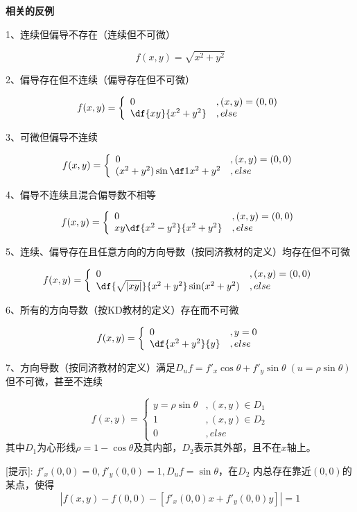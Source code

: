 \begin{shaded}
{\bf 相关的反例}

1、连续但偏导不存在（连续但不可微）

$$f(x,y)=\sqrt{x^2+y^2}$$

2、偏导存在但不连续（偏导存在但不可微）

$$
f(x,y)=\left\{\begin{array}{ll}
0 & ,(x,y)=(0,0)\\
\df{xy}{x^2+y^2}& ,else
\end{array}\right.
$$

3、可微但偏导不连续

$$
f(x,y)=\left\{\begin{array}{ll}
0 & ,(x,y)=(0,0)\\
(x^2+y^2)\sin\df1{x^2+y^2}& ,else
\end{array}\right.
$$

4、偏导不连续且混合偏导数不相等

$$
f(x,y)=\left\{\begin{array}{ll}
0 & ,(x,y)=(0,0)\\
xy\df{x^2-y^2}{x^2+y^2}& ,else
\end{array}\right.
$$

5、连续、偏导存在且任意方向的方向导数（按同济教材的定义）均存在但不可微

$$
f(x,y)=\left\{\begin{array}{ll}
0 & ,(x,y)=(0,0)\\
\df{\sqrt{|xy|}}{x^2+y^2}\sin(x^2+y^2)& ,else
\end{array}\right.
$$

6、所有的方向导数（按KD教材的定义）存在而不可微

$$
f(x,y)=\left\{\begin{array}{ll}
0 & ,y=0\\
\df{x^2+y^2}{y}& ,else
\end{array}\right.
$$

7、方向导数（按同济教材的定义）满足$D_uf=f'_x\cos\theta+f'_y\sin\theta\;
(u=\rho\sin\theta)$但不可微，甚至不连续

$$
f(x,y)=\left\{\begin{array}{ll}
y=\rho\sin\theta & ,(x,y)\in D_1\\
1& ,(x,y)\in D_2\\
0& ,else
\end{array}\right.
$$
其中$D_1$为心形线$\rho=1-\cos\theta$及其内部，$D_2$表示其外部，且不在$x$轴上。

[提示]: $f'_x(0,0)=0,f'_y(0,0)=1,D_uf=\sin\theta$，在$D_2$
内总存在靠近$(0,0)$的某点，使得
$$|f(x,y)-f(0,0)-[f'_x(0,0)x+f'_y(0,0)y]|=1$$


\end{shaded}

